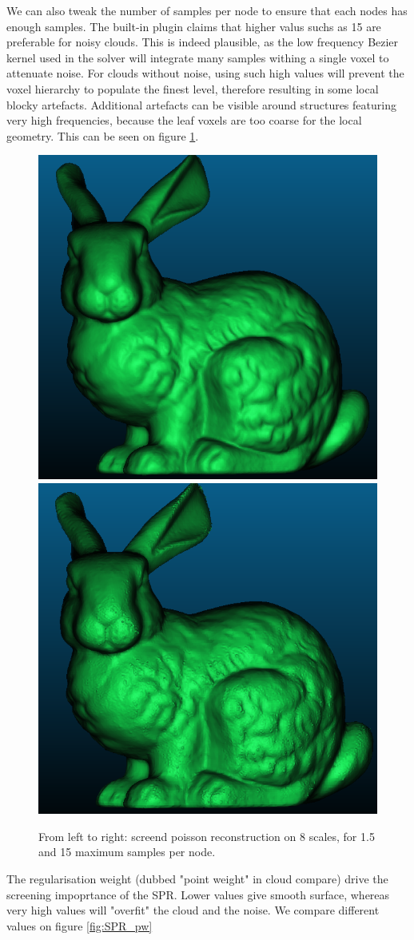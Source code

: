 \documentclass[a4paper]{article}
\begin{document}
We can also tweak the number of samples per node to ensure that each nodes has enough samples.
The built-in plugin claims that higher valus suchs as 15 are preferable for noisy clouds.
This is indeed plausible, as the low frequency Bezier kernel used in the solver will integrate
many samples withing a single voxel to attenuate noise.
For clouds without noise, using such high values will prevent the voxel hierarchy to
populate the finest level, therefore resulting in some local blocky artefacts.
Additional artefacts can be visible around structures featuring very high frequencies,
because the leaf voxels are too coarse for the local geometry. This can be seen on figure \ref{fig:SPR_spn}.

\begin{figure}[ht]
  \centering
  \includegraphics[width=0.3\linewidth]{figures/n=08 .png}
  \includegraphics[width=0.3\linewidth]{figures/n=08_15_spn.png}
  \caption{From left to right: screend poisson reconstruction on 8 scales, for 1.5 and 15 maximum samples per node.}
  \label{fig:SPR_spn}
\end{figure}


The regularisation weight (dubbed "point weight" in cloud compare) drive the screening
impoprtance of the SPR. Lower values give smooth surface, whereas very high values will
"overfit" the cloud and the noise. We compare different values on figure \ref{fig:SPR_pw}
\end{document}
